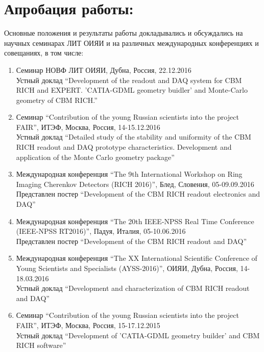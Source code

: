\section*{Апробация работы:}


Основные положения и результаты работы докладывались и обсуждались на научных семинарах ЛИТ ОИЯИ и на различных международных конференциях и совещаниях, в том числе:

\begin{enumerate}

\item Семинар НОВФ ЛИТ ОИЯИ, Дубна, Россия, 22.12.2016 \\
Устный доклад ``Development of the readout and DAQ system for CBM RICH and EXPERT. 'CATIA-GDML geometry buidler' and Monte-Carlo geometry of CBM RICH.''

\item Семинар ``Contribution of the young Russian scientists into the project FAIR'', ИТЭФ, Москва, Россия, 14-15.12.2016 \\
Устный доклад ``Detailed study of the stability and uniformity of the CBM RICH readout and DAQ prototype characteristics. Development and application of the Monte Carlo geometry package''

\item Международная конференция ``The 9th International Workshop on Ring Imaging Cherenkov Detectors (RICH 2016)'', Блед, Словения, 05-09.09.2016 \\
Представлен постер ``Development of the CBM RICH readout electronics and DAQ''

\item Международная конференция ``The 20th IEEE-NPSS Real Time Conference (IEEE-NPSS RT2016)'', Падуя, Италия, 05-10.06.2016 \\
Представлен постер ``Development of the CBM RICH readout and DAQ''

\item Международная конференция ``The XX International Scientific Conference of Young Scientists and Specialists (AYSS-2016)'', ОИЯИ, Дубна, Россия, 14-18.03.2016 \\
Устный доклад ``Development and characterization of CBM RICH readout and DAQ''

\item Семинар ``Contribution of the young Russian scientists into the project FAIR'', ИТЭФ, Москва, Россия, 15-17.12.2015 \\
Устный доклад ``Development of 'CATIA-GDML geometry builder' and CBM RICH software''


\end{enumerate}
